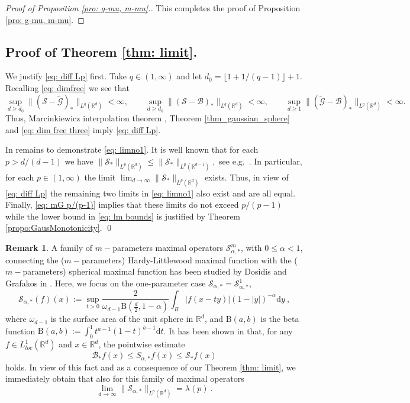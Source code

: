 \documentclass[a4paper, reqno]{amsart}
\theoremstyle{definition}
\newtheorem{remark}[thm]{Remark}
\newcommand{\R}{{\mathbb R}}
\newcommand{\dd}{{\mathrm d}}
\newcommand{\tmG}{\tilde{\mathcal{G}}}
\newcommand{\mB}{\mathcal{B}}
\newcommand{\mS}{\mathcal{S}}
\newcommand{\lm}{\lambda}
\begin{document}
\begin{proof}[Proof of Proposition \ref{pro: g-mu, m-mu}.]
This completes the proof of Proposition \ref{pro: g-mu, m-mu}.
 \end{proof}

 \subsection{Proof of Theorem \ref{thm: limit}.} We justify \eqref{eq: diff Lp} first.
Take $q\in (1,\infty)$ and let $d_0=\lfloor 1+1/(q-1)\rfloor+1.$ Recalling \eqref{eq: dimfree} we see that
\begin{equation}
\label{eq: dim free three}
 \sup_{d \ge d_0 } \|(\mS-\tmG)_*\|_{L^q(\R^d)}<\infty,\qquad  \sup_{d \ge d_0 } \|(\mS-\mB)_*\|_{L^q(\R^d)} < \infty,\qquad \sup_{d\ge 1} \|(\tmG-\mB)_*\|_{L^q(\R^d)}<\infty.
\end{equation}
Thus, Marcinkiewicz interpolation theorem \cite[Theorem 1.3.2]{Gr14}, Theorem \ref{thm_gaussian_sphere} and \eqref{eq: dim free three} imply \eqref{eq: diff Lp}.

In remains to demonstrate \eqref{eq: limno1}. It is well known that for each $p>d/(d-1)$ we have $\|\mS_*\|_{L^p(\R^d)}\le \|\mS_*\|_{L^p(\R^{d-1})},$ see e.g.\ \cite[eq.\ (2.10)]{BMSW21}. In particular, for each $p\in (1,\infty)$ the limit $\lim_{d\to \infty}\|\mS_*\|_{L^p(\R^d)}$ 
exists. Thus, in view of \eqref{eq: diff Lp} the remaining two limits in \eqref{eq: limno1} also exist and are all equal. Finally, \eqref{eq: mG p/(p-1)} implies that these limits do not exceed $p/(p-1)$ while the lower bound in \eqref{eq: lm bounds} is justified by Theorem \ref{propo:GausMonotonicity}.
\qed

\begin{remark}
\label{rem: DG}
    A family of $m-$parameters maximal operators $\mathcal{S}^m_{\alpha,\ast}$, with $0\leq \alpha <1$, connecting the ($m-$parameters) Hardy-Littlewood maximal function with the ($m-$parameters) spherical maximal function has been studied by Dosidis and Grafakos in \cite{DG21}. Here, we focus on the one-parameter case $\mathcal{S}_{\alpha,\ast}=\mathcal{S}^1_{\alpha,\ast}$, 
    $$\mathcal{S}_{\alpha,\ast}(f)(x):=\sup_{t>0} \frac{2}{\omega_{d-1}\mathrm{B}(\frac{d}{2},1-\alpha)}\int_{B}|f(x-ty)|(1-|y|)^{-\alpha}\dd y~,$$
    where $\omega_{d-1}$ is the surface area of the unit sphere in $\mathbb{R}^d$, and $\mathrm{B}(a,b)$ is the beta function $\mathrm{B}(a,b):=\int_0^1 t^{a-1}(1-t)^{b-1}\dd t$. It has been shown in \cite{DG21} that, for any $f\in L^1_{loc}(\mathbb{R}^d)$ and $x\in\mathbb{R}^d$, the pointwise estimate
    $$\mB_\ast f(x)\leq S_{\alpha,\ast}f(x)\leq \mS_\ast f(x)$$
    holds.  In view of this fact and as a consequence of our Theorem \ref{thm: limit}, we immediately obtain that also for this family of maximal operators
    $$\lim_{d\rightarrow\infty} \|\mathcal{S}_{\alpha,\ast}\|_{L^p(\mathbb{R}^d)} = \lm(p)~.$$
    
\end{remark}
\end{document}
